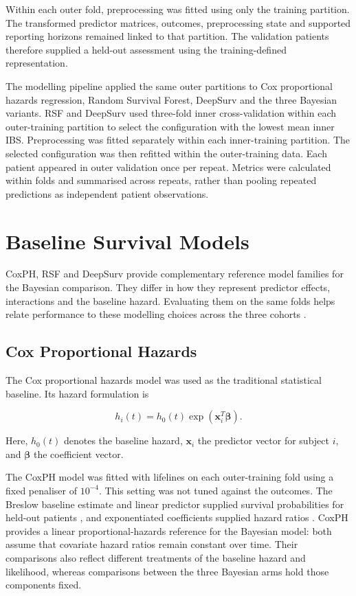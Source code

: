 Within each outer fold, preprocessing was fitted using only the training partition. The transformed predictor matrices, outcomes, preprocessing state and supported reporting horizons remained linked to that partition. The validation patients therefore supplied a held-out assessment using the training-defined representation.

The modelling pipeline applied the same outer partitions to Cox proportional hazards regression, Random Survival Forest, DeepSurv and the three Bayesian variants. RSF and DeepSurv used three-fold inner cross-validation within each outer-training partition to select the configuration with the lowest mean inner IBS. Preprocessing was fitted separately within each inner-training partition. The selected configuration was then refitted within the outer-training data. Each patient appeared in outer validation once per repeat. Metrics were calculated within folds and summarised across repeats, rather than pooling repeated predictions as independent patient observations.

\section{Baseline Survival Models}\label{baseline-survival-models}

CoxPH, RSF and DeepSurv provide complementary reference model families for the Bayesian comparison. They differ in how they represent predictor effects, interactions and the baseline hazard. Evaluating them on the same folds helps relate performance to these modelling choices across the three cohorts \cite{ref33,ref37,ref44}.

\subsection{Cox Proportional Hazards}\label{cox-proportional-hazards}

The Cox proportional hazards model was used as the traditional statistical baseline. Its hazard formulation is

\begin{equation}
    h_{i}(t) = h_{0}(t)\exp\left( \mathbf{x}_{i}^{T}\mathbf{\beta} \right).
\end{equation}


Here, $h_0(t)$ denotes the baseline hazard, $\mathbf{x}_i$ the predictor vector for subject $i$, and $\boldsymbol{\beta}$ the coefficient vector.

The CoxPH model was fitted with lifelines on each outer-training fold using a fixed penaliser of $10^{-4}$. This setting was not tuned against the outcomes. The Breslow baseline estimate and linear predictor supplied survival probabilities for held-out patients \cite{breslow1974}, and exponentiated coefficients supplied hazard ratios \cite{cox1972}. CoxPH provides a linear proportional-hazards reference for the Bayesian model: both assume that covariate hazard ratios remain constant over time. Their comparisons also reflect different treatments of the baseline hazard and likelihood, whereas comparisons between the three Bayesian arms hold those components fixed.


